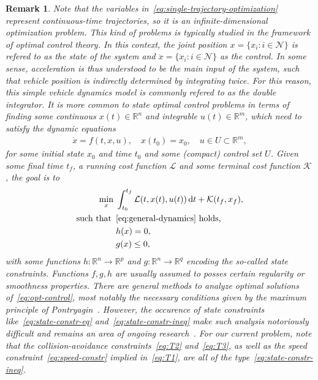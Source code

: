\documentclass[a4paper]{report}
\theoremstyle{definition}
\theoremstyle{plain}
\newtheorem{remark}{Remark}[chapter]
\newcommand*\diff{\mathop{}\!\mathrm{d}}
\begin{document}
\begin{remark}\label{rem:state-constraints}
  Note that the variables in~\eqref{eq:single-trajectory-optimization} represent
  continuous-time trajectories, so it is an infinite-dimensional optimization
  problem.
  This kind of problems is typically studied in the framework of optimal control theory.
  In this context, the joint position $x = \{x_{i} : i \in \mathcal{N}\}$ is
  refered to as the \emph{state} of the system and
  $\ddot{x} = \{\ddot{x}_{i} : i \in \mathcal{N} \}$ as the \emph{control}.
  In some sense, acceleration is thus understood to be the main input of the system, such that
  vehicle position is indirectly determined by integrating twice. For this reason,
  this simple vehicle dynamics model is commonly refered to as the \emph{double integrator}.
  It is more common to state optimal control problems in terms of finding some
  continuous $x(t) \in \mathbb{R}^{n}$ and integrable $u(t) \in \mathbb{R}^{m}$,
  which need to satisfy the dynamic equations
  \begin{align}\label{eq:general-dynamics}
    \dot{x} = f(t, x, u) , \quad x(t_{0}) = x_{0} , \quad u \in U \subset \mathbb{R}^{m},
  \end{align}
  for some initial state $x_{0}$ and time $t_{0}$ and some (compact) control set
  $U$. Given some final time $t_{f}$, a running cost function $\mathcal{L}$ and
  some terminal cost function $\mathcal{K}$, the goal is to
  \begin{subequations}\label{eq:opt-control}
  \begin{align}
    \min_{x} \; & \int_{t_{0}}^{t_{f}} \mathcal{L}(t, x(t), u(t)) \diff t + \mathcal{K}(t_{f}, x_{f}) , \\
      \textnormal{such that } \, &\eqref{eq:general-dynamics} \textnormal{ holds, } \\
                    & h(x) = 0 , \label{eq:state-constr-eq} \\
                    & g(x) \leq 0 , \label{eq:state-constr-ineq}
  \end{align}
  \end{subequations}
  with some functions $h : \mathbb{R}^{n} \rightarrow \mathbb{R}^{p}$ and
  $g : \mathbb{R}^{n} \rightarrow \mathbb{R}^{q}$ encoding the so-called state
  constraints. Functions $f, g, h$ are usually assumed to posses certain
  regularity or smoothness properties.
  There are general methods to analyze optimal solutions
  of~\eqref{eq:opt-control}, most notably the necessary conditions given by the
  maximum principle of Pontryagin~\cite{liberzonCalculusVariationsOptimal}.
  However, the occurence of state constraints like~\eqref{eq:state-constr-eq}
  and~\eqref{eq:state-constr-ineq} make such analysis notoriously difficult and
  remains an area of ongoing research~\cite{hartlSurveyMaximumPrinciples1995}.
  For our current problem, note that the collision-avoidance
  constraints~\eqref{eq:T2} and~\eqref{eq:T3}, as well as the speed
  constraint~\eqref{eq:speed-constr} implied in~\eqref{eq:T1}, are all of the
  type~\eqref{eq:state-constr-ineq}.
\end{remark}
\end{document}
